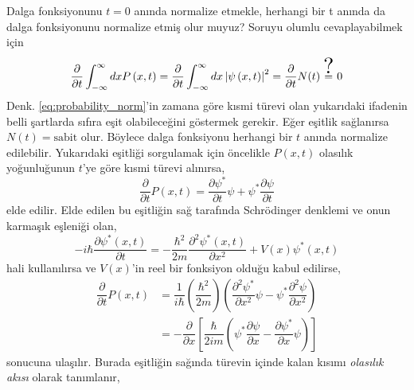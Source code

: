 \documentclass[00_kitap.tex]{subfiles}
\begin{document}

Dalga fonksiyonunu $t=0$ anında normalize etmekle, herhangi bir t anında da dalga fonksiyonunu normalize etmiş olur muyuz? Soruyu olumlu cevaplayabilmek için 
\begin{equation}
\dfrac {\partial }{\partial t} \int ^{\infty }_{-\infty }dxP\left( x,t\right) = \dfrac {\partial }{\partial t} \int ^{\infty }_{-\infty }dx\left| \psi \left( x,t\right) \right| ^{2}= \dfrac {\partial }{\partial t}N(t) \stackrel{\scalebox{2}{?}}{=} 0 
\label{eq:probability_norm_derivative}
\end{equation}
Denk. \ref{eq:probability_norm}'in zamana göre kısmi türevi olan yukarıdaki ifadenin belli şartlarda sıfıra eşit olabileceğini göstermek gerekir. Eğer eşitlik sağlanırsa $N(t) = \text{sabit}$ olur. Böylece dalga fonksiyonu herhangi bir $t$ anında normalize edilebilir. Yukarıdaki eşitliği sorgulamak için öncelikle $P(x,t)$ olasılık yoğunluğunun $t$'ye göre kısmi türevi alınırsa,
\begin{equation}
\dfrac {\partial }{\partial t}P\left( x,t\right) = \dfrac {\partial \psi ^{\ast }}{\partial t}\psi +\psi ^{\ast }\dfrac {\partial \psi }{\partial t}
\label{eq:probability_derivative_t}
\end{equation}
elde edilir. Elde edilen bu eşitliğin sağ tarafında Schrödinger denklemi ve onun karmaşık eşleniği olan,
\begin{equation}
-i\hbar \dfrac {\partial \psi ^{\ast }\left( x,t\right) }{\partial t}=-\dfrac {\hbar ^{2}}{2m}\dfrac {\partial ^{2}\psi ^{\ast }\left( x,t\right) }{\partial x^{2}}+V\left( x\right) \psi ^{\ast }\left( x,t\right)
\label{eq:schrodinger_conjugate}
\end{equation}
hali kullanılırsa ve $V(x)$'in reel bir fonksiyon olduğu kabul edilirse,
\begin{align}
\dfrac {\partial }{\partial t}P\left( x,t\right) &=\dfrac {1}{i\hbar }\left( \dfrac {\hbar ^{2}}{2m}\right) \left( \dfrac {\partial ^{2}\psi ^{\ast }}{\partial x^{2}}\psi -\psi ^{\ast }\dfrac {\partial ^{2}\psi }{\partial x^{2}}\right) \\
&=-\dfrac {\partial }{\partial x}\left[ \dfrac {\hbar }{2im}\left( \psi ^{\ast }\dfrac {\partial \psi }{\partial x}-\dfrac {\partial \psi ^{\ast }}{\partial x}\psi \right) \right]
\end{align}
sonucuna ulaşılır. Burada eşitliğin sağında türevin içinde kalan kısımı \emph{olasılık akısı} olarak tanımlanır,
\end{document}
